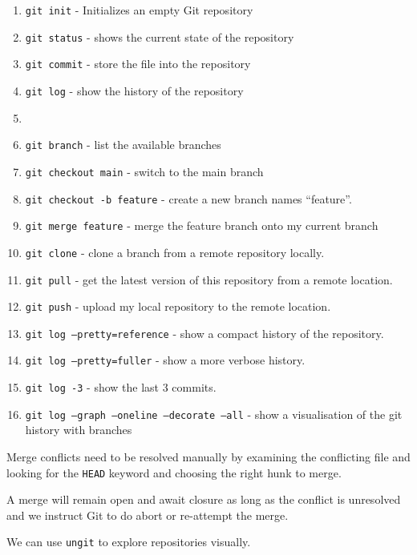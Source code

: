 \begin{enumerate}
	\item \texttt{git init} - Initializes an empty Git repository
	\item \texttt{git status} - shows the current state of the repository 
	\item \texttt{git commit} - store the file into the repository 
	\item \texttt{git log} - show the history of the repository
	\item 	\item \texttt{git branch} - list the available branches
	\item \texttt{git checkout main} - switch to the main branch
	\item \texttt{git checkout -b feature} - create a new branch names ``feature''.
	\item \texttt{git merge feature} - merge the feature branch onto my current branch 
	\item \texttt{git clone} - clone a branch from a remote repository locally.
	\item \texttt{git pull} - get the latest version of this repository from a remote location.
	\item \texttt{git push} - upload my local repository to the remote location.
	\item \texttt{git log --pretty=reference} - show a compact history of the repository.
	\item \texttt{git log --pretty=fuller} - show a more verbose history.
	\item \texttt{git log -3} - show the last 3 commits.
	\item \texttt{git log --graph --oneline --decorate --all} - show a visualisation of the git history with branches
\end{enumerate}

Merge conflicts need to be resolved manually by examining the conflicting file and looking for the \texttt{HEAD} keyword and choosing the right hunk to merge.

A merge will remain open and await closure as long as the conflict is unresolved and we instruct Git to do abort or re-attempt the merge.

We can use \texttt{ungit} to explore repositories visually.

 




